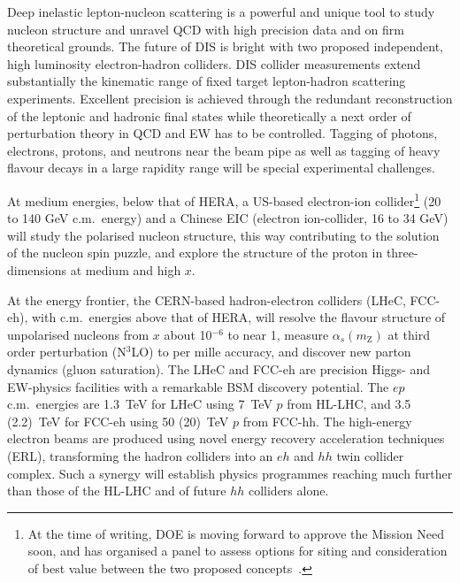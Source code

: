 Deep inelastic lepton-nucleon scattering is a powerful and unique tool to study
nucleon structure and unravel QCD with high precision data and on firm
theoretical grounds. The future of DIS is bright with two proposed independent,
high luminosity electron-hadron colliders. DIS collider measurements extend substantially the
kinematic range of fixed target lepton-hadron scattering experiments. Excellent
precision is achieved through the redundant reconstruction of the leptonic and
hadronic final states while theoretically a next order of perturbation theory
in QCD and EW has to be controlled. Tagging of photons, electrons, protons, and
neutrons near the beam pipe as well as tagging of heavy flavour decays in a
large rapidity range will be special experimental challenges.

At medium energies, below that of HERA, a US-based electron-ion collider\footnote{At the time of writing, DOE is moving forward to approve the
Mission Need soon, and has organised a panel to assess options for siting and
consideration of best value between the two proposed concepts~\cite{Hallman:2019}.} (20 to
140 GeV c.m.\ energy) and a Chinese EIC (electron ion-collider, 16 to 34 GeV) will study the polarised
nucleon structure, this way contributing to the solution of the nucleon spin
puzzle, and explore the structure of the proton in three-dimensions at medium
and high $x$.

At the energy frontier, the CERN-based hadron-electron colliders (LHeC,
FCC-eh), with c.m.\ energies above that of HERA, will resolve the flavour
structure of unpolarised nucleons from $x$ about 10$^{-6}$ to near 1, measure
$\alpha_s(m_\text{Z})$ at third order perturbation (N$^3$LO) to per mille accuracy, and
discover new parton dynamics (gluon saturation). The LHeC and FCC-eh are precision
Higgs- and EW-physics facilities with a remarkable BSM discovery potential. The $ep$ c.m.\ energies are 1.3~TeV for LHeC using
7~TeV $p$ from HL-LHC, and 3.5 (2.2)~TeV for FCC-eh using 50 (20)~TeV $p$ from
FCC-hh. The high-energy electron beams are produced using novel energy recovery
acceleration techniques (ERL), transforming the hadron colliders into an $eh$ and
$hh$ twin collider complex. Such a synergy will establish physics programmes
reaching much further than those of the HL-LHC and of future $hh$ colliders alone.

